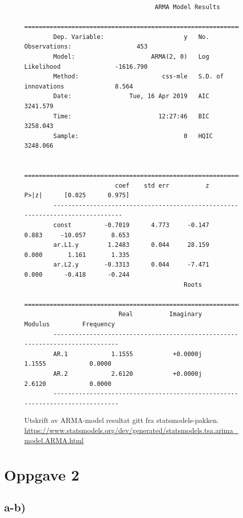 \begin{figure}[hbt!]
    \begin{lstlisting}
                                    ARMA Model Results
        ==============================================================================
        Dep. Variable:                      y   No. Observations:                  453
        Model:                     ARMA(2, 0)   Log Likelihood               -1616.790
        Method:                       css-mle   S.D. of innovations              8.564
        Date:                Tue, 16 Apr 2019   AIC                           3241.579
        Time:                        12:27:46   BIC                           3258.043
        Sample:                             0   HQIC                          3248.066
        
        ==============================================================================
                         coef    std err          z      P>|z|      [0.025      0.975]
        ------------------------------------------------------------------------------
        const         -0.7019      4.773     -0.147      0.883     -10.057       8.653
        ar.L1.y        1.2483      0.044     28.159      0.000       1.161       1.335
        ar.L2.y       -0.3313      0.044     -7.471      0.000      -0.418      -0.244
                                            Roots
        =============================================================================
                          Real          Imaginary           Modulus         Frequency
        -----------------------------------------------------------------------------
        AR.1            1.1555           +0.0000j            1.1555            0.0000
        AR.2            2.6120           +0.0000j            2.6120            0.0000
        -----------------------------------------------------------------------------
    \end{lstlisting}
\caption{Utskrift av ARMA-model resultat gitt fra statsmodels-pakken. \url{https://www.statsmodels.org/dev/generated/statsmodels.tsa.arima\_model.ARMA.html}}
\label{Armacoefs}
\end{figure}



\section{Oppgave 2}
\subsection{a-b)}

